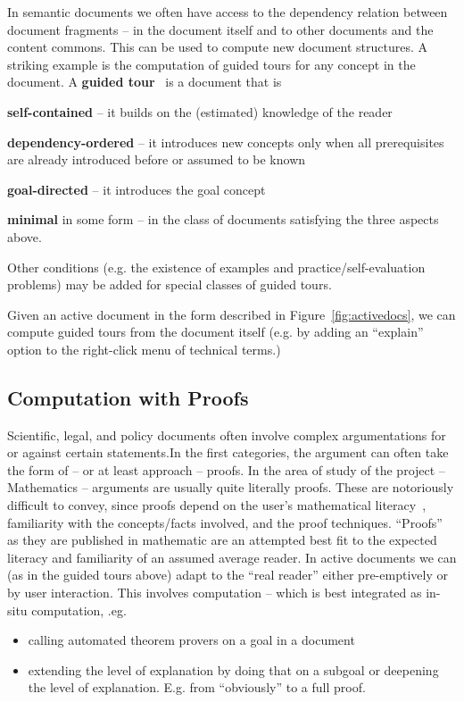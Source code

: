 In semantic documents we often have access to the dependency relation between document
fragments -- in the document itself and to other documents and the content commons. This
can be used to compute new document structures. A striking example is the computation of
guided tours for any concept in the document. A \textbf{guided
  tour}~\cite{KohDavGin:psewads11} is a document that is 
\begin{compactitem}
\item \textbf{self-contained} -- it builds on the (estimated) knowledge of the reader 
\item \textbf{dependency-ordered} -- it introduces new concepts only when all prerequisites are
  already introduced before or assumed to be known
\item \textbf{goal-directed} -- it introduces the goal concept
\item \textbf{minimal} in some form -- in the class of documents satisfying the three
  aspects above.
\end{compactitem}
Other conditions (e.g. the existence of examples and practice/self-evaluation problems)
may be added for special classes of guided tours.

Given an active document in the form described in Figure~\ref{fig:activedocs}, we can
compute guided tours from the document itself (e.g. by adding an ``explain'' option to the
right-click menu of technical terms.)

\subsection{Computation with Proofs}

Scientific, legal, and policy documents often involve complex argumentations for or
against certain statements.In the first categories, the argument can often take the form
of -- or at least approach -- proofs. In the area of study of the \pn project --
Mathematics -- arguments are usually quite literally proofs. These are notoriously
difficult to convey, since proofs depend on the user's mathematical
literacy~\cite{IanKoh:mlkmim15}, familiarity with the concepts/facts involved, and the
proof techniques. ``Proofs'' as they are published in mathematic are an attempted best fit
to the expected literacy and familiarity of an assumed average reader. In active documents
we can (as in the guided tours above) adapt to the ``real reader'' either pre-emptively or
by user interaction. This involves computation -- which is best integrated as in-situ
computation, .eg.  
\begin{itemize}
  \item calling automated theorem provers on a goal in a document
  \item extending the level of explanation by doing that on a subgoal or deepening the
    level of explanation. E.g. from ``obviously'' to a full proof.
  \end{itemize}






